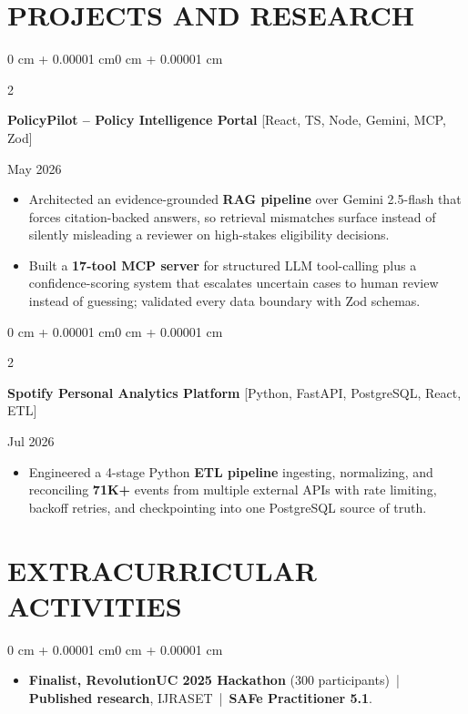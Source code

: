 \documentclass[10pt, letterpaper]{article}
\newenvironment{highlights}{
    \begin{itemize}[
        topsep=0.10 cm,
        parsep=0.06 cm,
        partopsep=0pt,
        itemsep=0.06 cm,
        leftmargin=12pt
    ]
}{
    \end{itemize}
}
\newenvironment{onecolentry}{
    \begin{adjustwidth}{0 cm + 0.00001 cm}{0 cm + 0.00001 cm}
}{
    \end{adjustwidth}
}
\newenvironment{twocolentry}[2][]{
    \onecolentry
    \def\secondColumn{#2}
    \setcolumnwidth{\fill, 4.5 cm}
    \begin{paracol}{2}
}{
    \switchcolumn \raggedleft \secondColumn
    \end{paracol}
    \endonecolentry
}
\begin{document}
\section{PROJECTS AND RESEARCH}
\begin{twocolentry}{May 2026}
\textbf{PolicyPilot -- Policy Intelligence Portal} [React, TS, Node, Gemini, MCP, Zod]
\end{twocolentry}
\begin{highlights}
  \item Architected an evidence-grounded \textbf{RAG pipeline} over Gemini 2.5-flash that forces citation-backed answers, so retrieval mismatches surface instead of silently misleading a reviewer on high-stakes eligibility decisions.
  \item Built a \textbf{17-tool MCP server} for structured LLM tool-calling plus a confidence-scoring system that escalates uncertain cases to human review instead of guessing; validated every data boundary with Zod schemas.
\end{highlights}

\vspace{0.12 cm}

\begin{twocolentry}{Jul 2026}
\textbf{Spotify Personal Analytics Platform} [Python, FastAPI, PostgreSQL, React, ETL]
\end{twocolentry}
\begin{highlights}
  \item Engineered a 4-stage Python \textbf{ETL pipeline} ingesting, normalizing, and reconciling \textbf{71K+} events from multiple external APIs with rate limiting, backoff retries, and checkpointing into one PostgreSQL source of truth.
\end{highlights}

\section{EXTRACURRICULAR ACTIVITIES}
\begin{onecolentry}
\begin{highlights}
  \item \textbf{Finalist, RevolutionUC 2025 Hackathon} (300 participants) \,|\, \textbf{Published research}, IJRASET \,|\, \textbf{SAFe Practitioner 5.1}.
\end{highlights}
\end{onecolentry}
\end{document}
